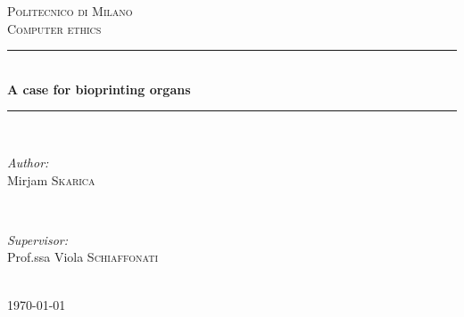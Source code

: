 \documentclass[12pt]{article} %
\begin{document}

\begin{titlepage}

\newcommand{\HRule}{\rule{\linewidth}{0.5mm}} %

\center %

\textsc{\LARGE Politecnico di Milano}\\[1.5cm] %
\textsc{\large Computer ethics}\\[0.5cm] %

\HRule \\[0.4cm]
{ \huge \bfseries A case for bioprinting organs}\\[0.4cm] %
\HRule \\[1.5cm]

\begin{minipage}{0.4\textwidth}
\begin{flushleft} \large
\emph{Author:}\\
Mirjam \textsc{Skarica} %
\end{flushleft}
\end{minipage}
~
\begin{minipage}{0.4\textwidth}
\begin{flushright} \large
\emph{Supervisor:} \\
Prof.ssa Viola  \textsc{Schiaffonati} %
\end{flushright}
\end{minipage}\\[4cm]

{\large \today}\\[3cm] %


\vfill %

\end{titlepage}

\end{document}
